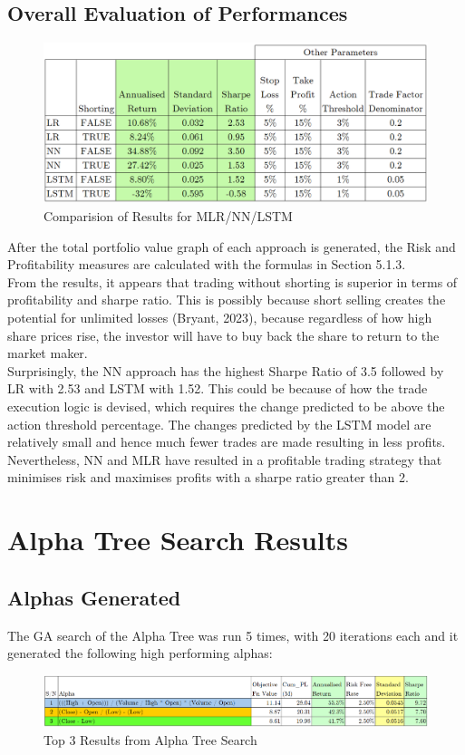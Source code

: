 \documentclass[a4paper,12pt]{report}
\numberwithin{equation}{section}
\theoremstyle{definition}
\begin{document}
\section{Overall Evaluation of Performances}

\begin{figure}[H]
  \centerline{\includegraphics[width=16cm]{ML_results_comparison}}
  \caption{Comparision of Results for MLR/NN/LSTM}
  \label{fig:Comparison of Results}
\end{figure}
After the total portfolio value graph of each approach is generated, the Risk and Profitability measures are calculated with the formulas in Section 5.1.3.\\


From the results, it appears that trading without shorting is superior in terms of profitability and sharpe ratio. This is possibly because short selling creates the potential for unlimited losses (Bryant, 2023), because regardless of how high share prices rise, the investor will have to buy back the share to return to the market maker. \\

Surprisingly, the NN approach has the highest Sharpe Ratio of 3.5 followed by LR with 2.53 and LSTM with 1.52. This could be because of how the trade execution logic is devised, which requires the change predicted to be above the action threshold percentage. The changes predicted by the LSTM model are relatively small and hence much fewer trades are made resulting in less profits. Nevertheless, NN and MLR have resulted in a profitable trading strategy that minimises risk and maximises profits with a sharpe ratio greater than 2. 


\chapter{Alpha Tree Search Results}
\section{Alphas Generated}
The GA search of the Alpha Tree was run 5 times, with 20 iterations each and it generated the following high performing alphas:
\begin{figure}[H]
  \centerline{\includegraphics[width=20cm]{generated_alphas}}
  \caption{Top 3 Results from Alpha Tree Search}
  \label{fig:alphas_generated}
\end{figure}
\end{document}
